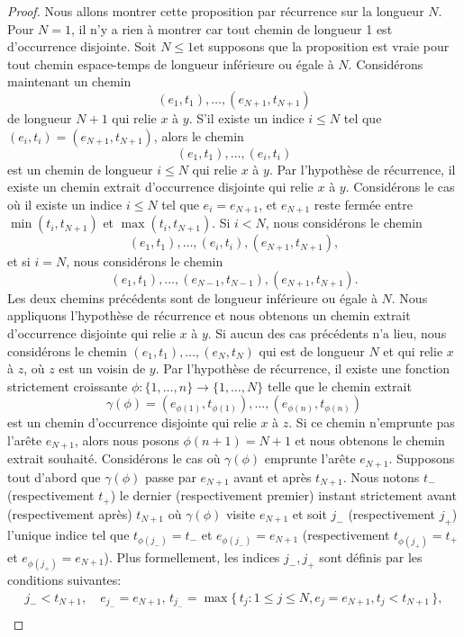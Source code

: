 \documentclass[titlepage,a4paper,12pt]{article}
\newcounter{d}
\newcounter{t}
\newcounter{p}
\newcounter{c}
\newcounter{a}
\newcounter{l}
\begin{document}
\begin{proof}
Nous allons montrer cette proposition par récurrence sur la longueur $N$. Pour $N=1$, il n'y a rien à montrer car tout chemin de longueur 1 est d'occurrence disjointe. Soit $N\leqslant 1$et supposons que la proposition est vraie pour tout chemin espace-temps de longueur inférieure ou égale à $N$. Considérons maintenant un chemin $$(e_1,t_1),\dots, (e_{N+1},t_{N+1})$$ de longueur $N+1$ qui relie $x$ à $y$. S'il existe un indice $i\leqslant N$ tel que $(e_i,t_i) = (e_{N+1},t_{N+1})$, alors le chemin $$(e_1,t_1),\dots,(e_i,t_i)
$$ est un chemin de longueur $i\leqslant N$ qui relie $x$ à $y$. Par l'hypothèse de récurrence, il existe un chemin extrait d'occurrence disjointe qui relie $x$ à $y$. Considérons le cas où il existe un indice $i\leqslant N$ tel que $e_i = e_{N+1}$, et $e_{N+1}$ reste fermée entre $\min(t_i,t_{N+1})$ et $\max(t_i,t_{N+1})$. Si $i< N$, nous considérons le chemin $$(e_1,t_1), \dots, (e_{i},t_{i}), (e_{N+1},t_{N+1}),$$ et si $i=N$, nous considérons le chemin
$$ (e_1,t_1),\dots, (e_{N-1},t_{N-1}),(e_{N+1},t_{N+1}).
$$Les deux chemins précédents sont de longueur inférieure ou égale à $N$. Nous appliquons l'hypothèse de récurrence et nous obtenons un chemin extrait d'occurrence disjointe qui relie $x$ à $y$. Si aucun des cas précédents n'a lieu, nous considérons le chemin $(e_1,t_1),\dots,(e_N,t_N)$ qui est de longueur $N$ et qui relie $x$ à $z$, où $z$ est un voisin de $y$. Par l'hypothèse de récurrence, il existe une fonction strictement croissante $\phi:\{1,\dots,n\}\rightarrow \{1,\dots, N\}$ telle que le chemin extrait $$\gamma(\phi) = (e_{\phi(1)},t_{\phi(1)}),\dots,(e_{\phi(n)},t_{\phi(n)})$$ est un chemin d'occurrence disjointe qui relie $x$ à $z$. 
Si ce chemin n'emprunte pas l'arête $e_{N+1}$, alors nous posons $\phi(n+1) = N+1$ et nous obtenons le chemin extrait souhaité.
Considérons le cas où $\gamma(\phi)$ emprunte l'arête $e_{N+1}$. Supposons tout d'abord que $\gamma(\phi)$ passe par $e_{N+1}$ avant et après $t_{N+1}$. Nous notons $t_-$ (respectivement $t_+$) le dernier (respectivement premier) instant strictement avant (respectivement après) $t_{N+1}$ où $\gamma(\phi)$ visite $e_{N+1}$ et soit $j_-$ (respectivement $j_+$) l'unique indice tel que $t_{\phi(j_-)}= t_-$ et $e_{\phi(j_-)}= e_{N+1}$ (respectivement $t_{\phi(j_+)}= t_+$ et $e_{\phi(j_+)}= e_{N+1}$). Plus formellement, les indices $j_-,j_+$ sont définis par les conditions suivantes:
\begin{align*}
{j_-}< t_{N+1},\quad e_{j_-} = e_{N+1},\, t_{j_-} = \max \big\{\,t_j:1\leqslant j \leqslant N, e_j = e_{N+1}, t_j < t_{N+1}\,\big\},\\

\end{align*}
\end{proof}
\end{document}
